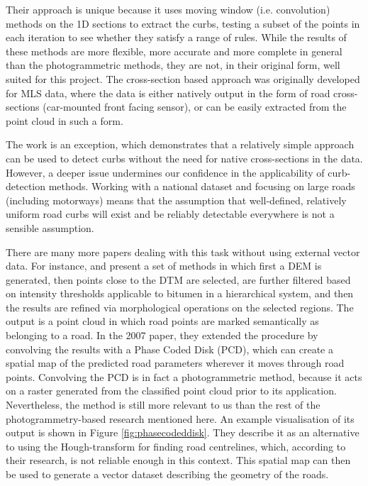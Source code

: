 Their approach is unique because it uses moving window (i.e. convolution) methods on the 1D sections to extract the curbs, testing a subset of the points in each iteration to see whether they satisfy a range of rules. While the results of these methods are more flexible, more accurate and more complete in general than the photogrammetric methods, they are not, in their original form, well suited for this project. The cross-section based approach was originally developed for MLS data, where the data is either natively output in the form of road cross-sections (car-mounted front facing sensor), or can be easily extracted from the point cloud in such a form.

The work \cite{vosselman_zhou_2009} is an exception, which demonstrates that a relatively simple approach can be used to detect curbs without the need for native cross-sections in the data. However, a deeper issue undermines our confidence in the applicability of curb-detection methods. Working with a national dataset and focusing on large roads (including motorways) means that the assumption that well-defined, relatively uniform road curbs will exist and be reliably detectable everywhere is not a sensible assumption.

There are many more papers dealing with this task without using external vector data. For instance, \cite{clode_etal_2004} and \cite{clode_etal_2007} present a set of methods in which first a DEM is generated, then points close to the DTM are selected, are further filtered based on intensity thresholds applicable to bitumen in a hierarchical system, and then the results are refined via morphological operations on the selected regions. The output is a point cloud in which road points are marked semantically as belonging to a road. In the 2007 paper, they extended the procedure by convolving the results with a Phase Coded Disk (PCD), which can create a spatial map of the predicted road parameters wherever it moves through road points. Convolving the PCD is in fact a photogrammetric method, because it acts on a raster generated from the classified point cloud prior to its application. Nevertheless, the method is still more relevant to us than the rest of the photogrammetry-based research mentioned here. An example visualisation of its output is shown in Figure \ref{fig:phasecodeddisk}. They describe it as an alternative to using the Hough-transform for finding road centrelines, which, according to their research, is not reliable enough in this context. This spatial map can then be used to generate a vector dataset describing the geometry of the roads.

